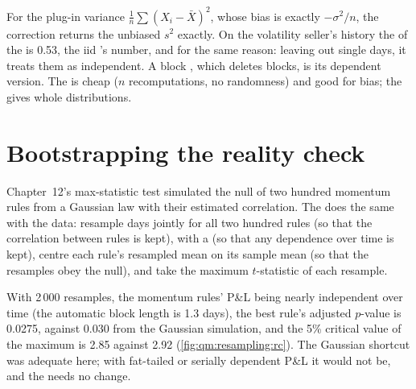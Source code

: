For the plug-in variance $\frac1n\sum(X_i - \bar X)^2$, whose bias is exactly $-\sigma^2/n$, the correction returns the unbiased $s^2$
exactly. On the volatility seller's history the   of the  is 0.53, the iid 's number, and
for the same reason: leaving out single days, it treats them as independent. A block , which deletes blocks, is its dependent
version. The  is cheap ($n$ recomputations, no randomness) and good for bias; the  gives whole distributions.

\section{Bootstrapping the reality check}

Chapter~12's max-statistic test simulated the null of two hundred momentum rules from a Gaussian law with their estimated correlation.
The  does the same with the data: resample days jointly for all two hundred rules (so that the correlation between rules is
kept), with a  (so that any dependence over time is kept), centre each rule's resampled mean on its sample mean (so
that the resamples obey the null), and take the maximum $t$-statistic of each resample.

With 2\,000  resamples, the momentum rules' P\&L being nearly independent over time (the automatic block length is
1.3 days), the best rule's adjusted $p$-value is 0.0275, against 0.030 from the Gaussian simulation, and the 5\% critical value of the
maximum is 2.85 against 2.92 (\cref{fig:qm:resampling:rc}). The Gaussian shortcut was adequate here; with fat-tailed or serially
dependent P\&L it would not be, and the  needs no change.

